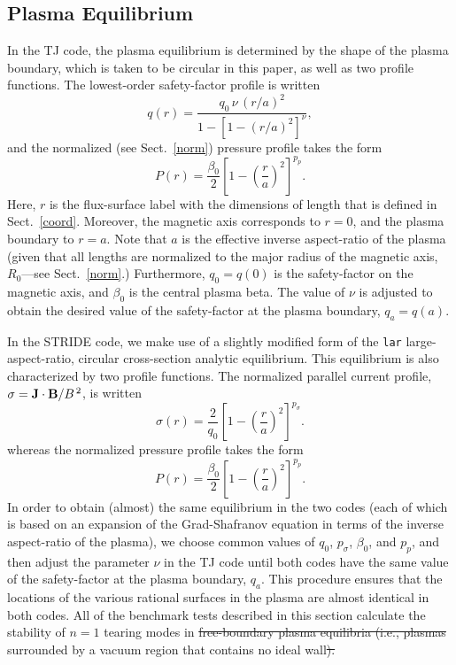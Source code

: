 \documentclass[12pt,prb,aps]{revtex4-1}
\providecommand{\DIFadd}[1]{{\protect\color{blue}\uwave{#1}}} %
\providecommand{\DIFdel}[1]{{\protect\color{red}\sout{#1}}}                      %
\providecommand{\DIFaddbegin}{} %
\providecommand{\DIFaddend}{} %
\providecommand{\DIFdelbegin}{} %
\providecommand{\DIFdelend}{} %
\newcommand{\DIFscaledelfig}{0.5}
\newlength{\DIFdelgraphicswidth} %
\newlength{\DIFdelgraphicsheight} %
\newcommand{\DIFaddincludegraphics}[2][]{{\color{blue}\fbox{\DIFOincludegraphics[#1]{#2}}}} %
\newcommand{\DIFdelincludegraphics}[2][]{%
\sbox{\DIFdelgraphicsbox}{\DIFOincludegraphics[#1]{#2}}%
\settoboxwidth{\DIFdelgraphicswidth}{\DIFdelgraphicsbox} %
\settoboxtotalheight{\DIFdelgraphicsheight}{\DIFdelgraphicsbox} %
\scalebox{\DIFscaledelfig}{%
\parbox[b]{\DIFdelgraphicswidth}{\usebox{\DIFdelgraphicsbox}\\[-\baselineskip] \rule{\DIFdelgraphicswidth}{0em}}\llap{\resizebox{\DIFdelgraphicswidth}{\DIFdelgraphicsheight}{%
\setlength{\unitlength}{\DIFdelgraphicswidth}%
\begin{picture}(1,1)%
\thicklines\linethickness{2pt} %
{\color[rgb]{1,0,0}\put(0,0){\framebox(1,1){}}}%
{\color[rgb]{1,0,0}\put(0,0){\line( 1,1){1}}}%
{\color[rgb]{1,0,0}\put(0,1){\line(1,-1){1}}}%
\end{picture}%
}\hspace*{3pt}}} %
} %
\DeclareRobustCommand{\DIFaddbegin}{\DIFOaddbegin \let\includegraphics\DIFaddincludegraphics} %
\DeclareRobustCommand{\DIFaddend}{\DIFOaddend \let\includegraphics\DIFOincludegraphics} %
\DeclareRobustCommand{\DIFdelbegin}{\DIFOdelbegin \let\includegraphics\DIFdelincludegraphics} %
\DeclareRobustCommand{\DIFdelend}{\DIFOaddend \let\includegraphics\DIFOincludegraphics} %
\begin{document}
\subsection{Plasma Equilibrium}
In the TJ code, the plasma equilibrium is determined by the shape of the plasma boundary, which is taken to be circular in this paper, as well as two profile functions. 
The lowest-order safety-factor profile is written\,\cite{tj}
\begin{equation}
q(r) = \frac{q_0\,\nu\,(r/a)^2}{1-[1-(r/a)^2]^\nu},
\end{equation}
and the normalized (see Sect.~\ref{norm}) pressure profile takes the form
\begin{equation}
P(r) = \frac{\beta_0}{2}\left[1-\left(\frac{r}{a}\right)^2\right]^{p_p}.
\end{equation}
Here, $r$ is the flux-surface label with the dimensions of length that is defined in Sect.~\ref{coord}.  Moreover, the magnetic axis corresponds to $r=0$, and the plasma
boundary to $r=a$.  Note that $a$ is the effective inverse aspect-ratio of the plasma (given that all lengths are normalized to the major radius of the magnetic axis, $R_0$---see Sect.~\ref{norm}.)
Furthermore, $q_0=q(0)$ is the safety-factor on the magnetic axis, and  $\beta_0$ is the central plasma beta. 
The value of $\nu$ is adjusted to obtain the desired value of the safety-factor at the plasma boundary, $q_a=q(a)$. 

In the  STRIDE code, we make use of a slightly modified form of the \verb|lar| 
large-aspect-ratio, circular cross-section analytic equilibrium. This equilibrium is also characterized by two profile functions. 
The 
 normalized parallel current profile, $\sigma={\bf J}\cdot{\bf B}/B^{\,2}$,  is written
\begin{equation}
\sigma(r) = \frac{2}{q_0}\left[1-\left(\frac{r}{a}\right)^2\right]^{p_\sigma}.
\end{equation}
whereas the  normalized pressure profile takes the form
\begin{equation}
P(r)= \frac{\beta_0}{2}\left[1-\left(\frac{r}{a}\right)^2\right]^{p_p}.
\end{equation}
In order to obtain (almost) the same equilibrium in the two codes (each of which is based on an expansion of the Grad-Shafranov equation in terms of the inverse aspect-ratio of the plasma), we choose common values of $q_0$, $p_\sigma$, $\beta_0$, and $p_p$, and then
adjust the parameter $\nu$ in the TJ code until both codes have the same value of the safety-factor at the plasma boundary, $q_a$. This procedure ensures that the locations of the various rational surfaces in the plasma are
almost identical in both codes. All of the benchmark tests  described in this section calculate the stability of $n=1$ tearing modes  in  \DIFdelbegin \DIFdel{free-boundary plasma equilibria (i.e., plasmas }\DIFdelend \DIFaddbegin \DIFadd{plasma equilibria }\DIFaddend surrounded by a vacuum region that contains no ideal wall\DIFdelbegin \DIFdel{). 
}\DIFdelend \DIFaddbegin \DIFadd{. 
}
\end{document}
